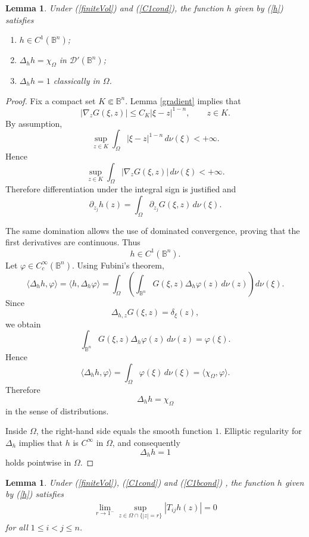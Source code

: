 \documentclass[12pt]{amsart}
\numberwithin{equation}{section}
\newtheorem{lemma}[thm]{Lemma}
\newcommand{\Bn}{\mathbb B^n}
\theoremstyle{plain}
\numberwithin{equation}{section}
\numberwithin{theorem}{section}
\numberwithin{proposition}{section}
\begin{document}
\begin{lemma}\label{Regularity} Under (\ref{finiteVol}) and (\ref{C1cond}), the function $h$ given by (\ref{h})
satisfies
\begin{enumerate}
\item \(h\in C^1(\Bn)\);
\item \(\Delta_h h=\chi_\Omega\) in \(\mathcal D'(\Bn)\);
\item \(\Delta_h h=1\) classically in \(\Omega\).
\end{enumerate}
\end{lemma}

\begin{proof} 
Fix a compact set \(K\Subset\Bn\). Lemma \ref{gradient} implies that
\[
|\nabla_zG(\xi,z)|
\le C_K |\xi-z|^{1-n},
\qquad z\in K.
\]
By assumption,
\[
\sup_{z\in K}
\int_\Omega |\xi-z|^{1-n}\,d\nu(\xi)<+\infty.
\]
Hence
\[
\sup_{z\in K}
\int_\Omega |\nabla_zG(\xi,z)|\,d\nu(\xi)<+\infty.
\]
Therefore differentiation under the integral sign is justified and
\[
\partial_{z_j}h(z)
=
\int_\Omega \partial_{z_j}G(\xi,z)\,d\nu(\xi).
\]

The same domination allows the use of dominated convergence, proving that the
first derivatives are continuous. Thus
\[
h\in C^1(\Bn).
\]
Let \(\varphi\in C_c^\infty(\mathbb B^n)\). Using Fubini's theorem,
\[
\langle \Delta_h h,\varphi\rangle
=
\langle h,\Delta_h\varphi\rangle
=
\int_\Omega
\left(
\int_{\Bn}
G(\xi,z)\Delta_h\varphi(z)\,d\nu(z)
\right)
d\nu(\xi).
\]
Since
\[
\Delta_{h,z}G(\xi,z)=\delta_\xi(z),
\]
we obtain
\[
\int_{\Bn}
G(\xi,z)\Delta_h\varphi(z)\,d\nu(z)
=
\varphi(\xi).
\]
Hence
\[
\langle \Delta_h h,\varphi\rangle
=
\int_\Omega \varphi(\xi)\,d\nu(\xi)
=
\langle \chi_\Omega,\varphi\rangle.
\]
Therefore
\[
\Delta_h h=\chi_\Omega
\]
in the sense of distributions.

Inside \(\Omega\), the right-hand side equals the smooth function \(1\).
Elliptic regularity for \(\Delta_h\) implies that \(h\) is \(C^\infty\) in
\(\Omega\), and consequently
\[
\Delta_h h=1
\]
holds pointwise in \(\Omega\).
\end{proof}
\begin{lemma}\label{Breg}
Under (\ref{finiteVol}), (\ref{C1cond}) and (\ref{C1bcond}) , the function $h$ given by (\ref{h})
satisfies
\begin{eqnarray}\label{hbreg}
\lim_{r\to1^-}
\sup_{z\in\Omega\cap\{|z|=r\}}
|T_{ij}h(z)|
=0
\end{eqnarray}
for all 
 \(1\le i<j\le n\).
\end{lemma}
\end{document}
